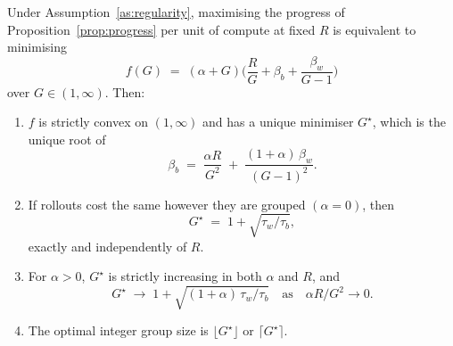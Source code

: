 \begin{theorem}
  \label{thm:split}
  Under Assumption~\ref{as:regularity}, maximising the progress of
  Proposition~\ref{prop:progress} per unit of compute at fixed $R$ is equivalent to minimising
  \begin{equation}
    \label{eq:objective}
    f(G) \;=\; (\alpha + G)\Big( \frac{R}{G} + \beta_b + \frac{\beta_w}{G-1} \Big)
  \end{equation}
  over $G \in (1, \infty)$. Then:
  \begin{enumerate}
    \item[(i)] $f$ is strictly convex on $(1,\infty)$ and has a unique minimiser $G^{\star}$, which
    is the unique root of
    \begin{equation}
      \label{eq:stationary}
      \beta_b \;=\; \frac{\alpha R}{G^2} \;+\; \frac{(1+\alpha)\,\beta_w}{(G-1)^2}.
    \end{equation}
    \item[(ii)] If rollouts cost the same however they are grouped $(\alpha = 0)$, then
    \begin{equation}
      \label{eq:gstar}
      G^{\star} \;=\; 1 + \sqrt{\tau_w/\tau_b},
    \end{equation}
    exactly and independently of $R$.
    \item[(iii)] For $\alpha > 0$, $G^{\star}$ is strictly increasing in both $\alpha$ and $R$, and
    \begin{equation}
      \label{eq:gstar-cost}
      G^{\star} \;\to\; 1 + \sqrt{(1+\alpha)\,\tau_w/\tau_b}
      \quad\text{as}\quad \alpha R/G^2 \to 0 .
    \end{equation}
    \item[(iv)] The optimal integer group size is $\lfloor G^{\star}\rfloor$ or
    $\lceil G^{\star}\rceil$.
  \end{enumerate}
\end{theorem}

